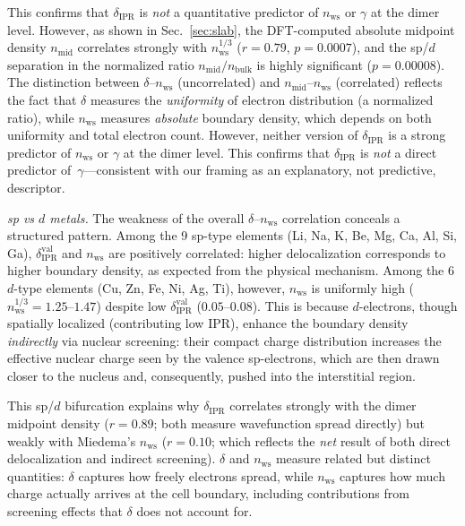 \documentclass[twocolumn,showpacs,preprintnumbers,amsmath,amssymb,prb]{revtex4-2}
\begin{document}
This confirms that $\delta_\mathrm{IPR}$ is \emph{not}
a quantitative predictor of $n_\mathrm{ws}$ or $\gamma$
at the dimer level. However, as shown in
Sec.~\ref{sec:slab}, the DFT-computed absolute midpoint
density $n_\mathrm{mid}$ correlates strongly with
$n_\mathrm{ws}^{1/3}$ ($r = 0.79$, $p = 0.0007$),
and the sp/$d$ separation in the normalized ratio
$n_\mathrm{mid}/n_\mathrm{bulk}$ is highly significant
($p = 0.00008$). The distinction between
$\delta$--$n_\mathrm{ws}$ (uncorrelated) and
$n_\mathrm{mid}$--$n_\mathrm{ws}$ (correlated) reflects
the fact that $\delta$ measures the \emph{uniformity}
of electron distribution (a normalized ratio), while
$n_\mathrm{ws}$ measures \emph{absolute} boundary
density, which depends on both uniformity and total
electron count.
However, neither version of $\delta_\mathrm{IPR}$ is a
strong predictor of $n_\mathrm{ws}$ or $\gamma$ at the
dimer level.
This confirms that $\delta_\mathrm{IPR}$ is \emph{not}
a direct predictor of~$\gamma$---consistent with our
framing as an explanatory, not predictive, descriptor.

\emph{sp vs $d$ metals.}
The weakness of the overall $\delta$--$n_\mathrm{ws}$ correlation
conceals a structured pattern.
Among the 9 sp-type elements (Li, Na, K, Be, Mg, Ca, Al, Si, Ga),
$\delta_\mathrm{IPR}^\mathrm{val}$ and $n_\mathrm{ws}$ are
positively correlated: higher delocalization corresponds to
higher boundary density, as expected from the physical mechanism.
Among the 6 $d$-type elements (Cu, Zn, Fe, Ni, Ag, Ti),
however, $n_\mathrm{ws}$ is uniformly high ($n_\mathrm{ws}^{1/3}
= 1.25$--$1.47$) despite low $\delta_\mathrm{IPR}^\mathrm{val}$
($0.05$--$0.08$).
This is because $d$-electrons, though spatially localized
(contributing low IPR), enhance the boundary density
\emph{indirectly} via nuclear screening: their compact
charge distribution increases the effective nuclear charge
seen by the valence sp-electrons, which are then drawn
closer to the nucleus and, consequently, pushed into the
interstitial region.

This sp/$d$ bifurcation explains why $\delta_\mathrm{IPR}$
correlates strongly with the dimer midpoint density
($r = 0.89$; both measure wavefunction spread directly)
but weakly with Miedema's $n_\mathrm{ws}$
($r = 0.10$; which reflects the \emph{net} result of both
direct delocalization and indirect screening).
$\delta$ and $n_\mathrm{ws}$ measure related but distinct
quantities: $\delta$ captures how freely electrons spread,
while $n_\mathrm{ws}$ captures how much charge actually
arrives at the cell boundary, including contributions from
screening effects that $\delta$ does not account for.
\end{document}
